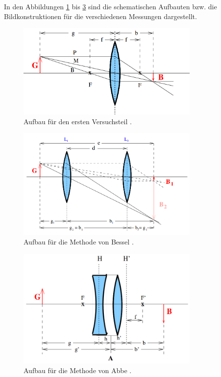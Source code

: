 \documentclass[
  parskip=half,
  bibliography=totoc,     %
  captions=tableheading,  %
  titlepage=firstiscover, %
]{scrartcl}
\begin{document}
\noindent
In den Abbildungen \ref{fig:V4081} bis \ref{fig:V4083} sind die schematischen
Aufbauten bzw. die Bildkonstruktionen für die verschiedenen Messungen dargestellt.
\begin{figure}[htb]
  \centering
  \includegraphics[width=0.8\textwidth]{V4081.png}
  \caption{Aufbau für den ersten Versuchsteil \cite{anleitung}.}
  \label{fig:V4081}
\end{figure}
\begin{figure}[htb]
  \centering
  \includegraphics[width=0.8\textwidth]{V4082.png}
  \caption{Aufbau für die Methode von Bessel \cite{anleitung}.}
  \label{fig:V4082}
\end{figure}
\clearpage
\begin{figure}[htb]
  \centering
  \includegraphics[width=0.8\textwidth]{V4083.png}
  \caption{Aufbau für die Methode von Abbe \cite{anleitung}.}
  \label{fig:V4083}
\end{figure}
\end{document}
